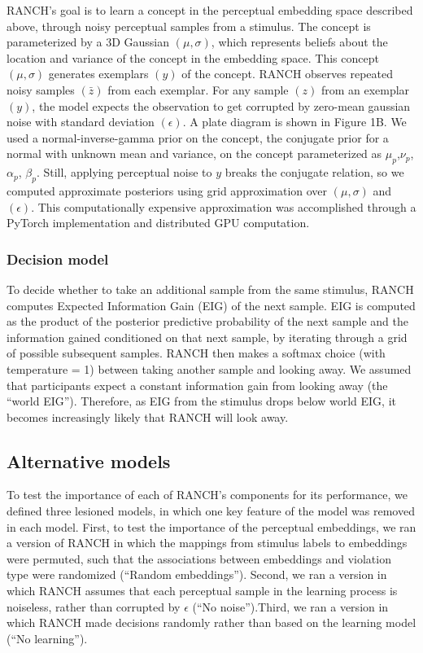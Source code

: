 \documentclass[10pt, letterpaper]{article}
\begin{document}
RANCH's goal is to learn a concept in the perceptual embedding space
described above, through noisy perceptual samples from a stimulus. The
concept is parameterized by a 3D Gaussian \((\mu,\sigma)\), which
represents beliefs about the location and variance of the concept in the
embedding space. This concept \((\mu,\sigma)\) generates exemplars
\((y)\) of the concept. RANCH observes repeated noisy samples
\((\bar{z})\) from each exemplar. For any sample \((z)\) from an
exemplar \((y)\), the model expects the observation to get corrupted by
zero-mean gaussian noise with standard deviation \((\epsilon)\). A plate
diagram is shown in Figure 1B. We used a normal-inverse-gamma prior on
the concept, the conjugate prior for a normal with unknown mean and
variance, on the concept parameterized as
\(\mu_{p}\),\(\nu_{p}\),\(\alpha_{p}\), \(\beta_{p}\). Still, applying
perceptual noise to \(y\) breaks the conjugate relation, so we computed
approximate posteriors using grid approximation over \((\mu,\sigma)\)
and \((\epsilon)\). This computationally expensive approximation was
accomplished through a PyTorch implementation and distributed GPU
computation.

\hypertarget{decision-model}{%
\subsubsection{Decision model}\label{decision-model}}

To decide whether to take an additional sample from the same stimulus,
RANCH computes Expected Information Gain (EIG) of the next sample. EIG
is computed as the product of the posterior predictive probability of
the next sample and the information gained conditioned on that next
sample, by iterating through a grid of possible subsequent samples.
RANCH then makes a softmax choice (with temperature = 1) between taking
another sample and looking away. We assumed that participants expect a
constant information gain from looking away (the ``world EIG'').
Therefore, as EIG from the stimulus drops below world EIG, it becomes
increasingly likely that RANCH will look away.

\hypertarget{alternative-models}{%
\subsection{Alternative models}\label{alternative-models}}

To test the importance of each of RANCH's components for its
performance, we defined three lesioned models, in which one key feature
of the model was removed in each model. First, to test the importance of
the perceptual embeddings, we ran a version of RANCH in which the
mappings from stimulus labels to embeddings were permuted, such that the
associations between embeddings and violation type were randomized
(``Random embeddings''). Second, we ran a version in which RANCH assumes
that each perceptual sample in the learning process is noiseless, rather
than corrupted by \(\epsilon\) (``No noise'').Third, we ran a version in
which RANCH made decisions randomly rather than based on the learning
model (``No learning'').
\end{document}
